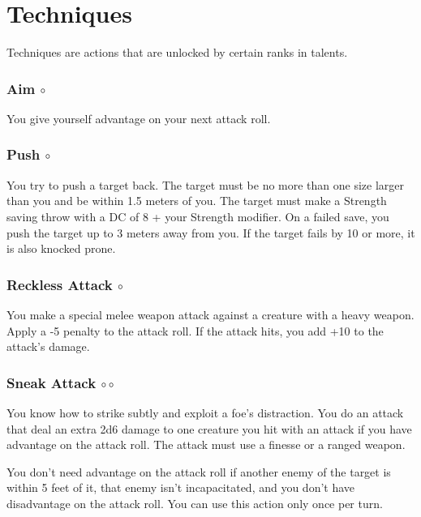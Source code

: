 \section{Techniques} %
Techniques are actions that are unlocked by certain ranks in talents. %


\subsubsection{Aim $\circ$} \label{act::aim}
    You give yourself advantage on your next attack roll.

\subsubsection{Push $\circ$} \label{act::push}
    You try to push a target back.
    The target must be no more than one size larger than you and be within 1.5 meters of you.
    The target must make a Strength saving throw with a DC of 8 + your Strength modifier.
    On a failed save, you push the target up to 3 meters away from you.
    If the target fails by 10 or more, it is also knocked prone.

\subsubsection{Reckless Attack $\circ$} \label{act::recklessattack}
    You make a special melee weapon attack against a creature with a heavy weapon.
    Apply a -5 penalty to the attack roll.
    If the attack hits, you add +10 to the attack's damage.

\subsubsection{Sneak Attack $\circ\circ$} \label{act::sneakattack}
    You know how to strike subtly and exploit a foe's distraction.
    You do an attack that deal an extra 2d6 damage to one creature you hit with an attack if you have advantage on the attack roll.
    The attack must use a finesse or a ranged weapon.

    You don't need advantage on the attack roll if another enemy of the target is within 5 feet of it, that enemy isn't incapacitated, and you don't have disadvantage on the attack roll.
    You can use this action only once per turn.


